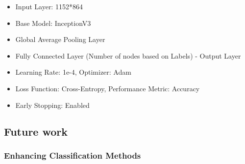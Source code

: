     
        
        
\begin{itemize}
    \item Input Layer: 1152*864
    \item Base Model: InceptionV3
    \item Global Average Pooling Layer
    \item Fully Connected Layer (Number of nodes based on Labels) - Output Layer
    \item Learning Rate: 1e-4, Optimizer: Adam
    \item Loss Function: Cross-Entropy, Performance Metric: Accuracy
    \item Early Stopping: Enabled
\end{itemize}

\subsection{Future work}

\subsubsection{Enhancing Classification Methods}

